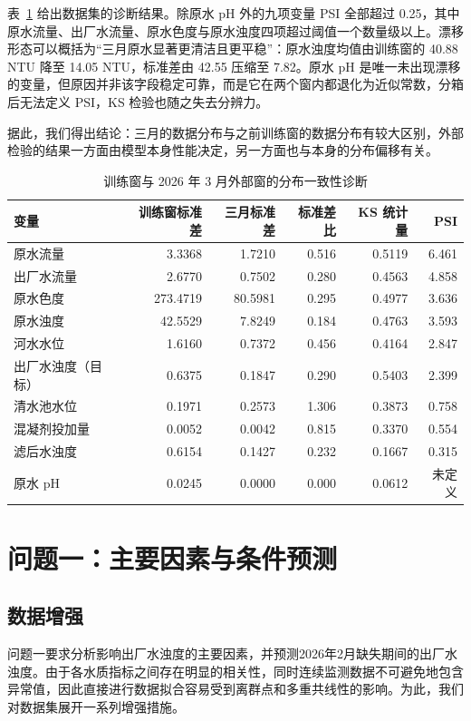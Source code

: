 \documentclass[UTF8,12pt,a4paper]{ctexart}
\begin{document}
表~\ref{tab:shift} 给出数据集的诊断结果。除原水 pH 外的九项变量 PSI 全部超过 0.25，其中原水流量、出厂水流量、原水色度与原水浊度四项超过阈值一个数量级以上。漂移形态可以概括为“三月原水显著更清洁且更平稳”：原水浊度均值由训练窗的 40.88 NTU 降至 14.05 NTU，标准差由 42.55 压缩至 7.82。原水 pH 是唯一未出现漂移的变量，但原因并非该字段稳定可靠，而是它在两个窗内都退化为近似常数，分箱后无法定义 PSI，KS 检验也随之失去分辨力。

据此，我们得出结论：三月的数据分布与之前训练窗的数据分布有较大区别，外部检验的结果一方面由模型本身性能决定，另一方面也与本身的分布偏移有关。

\begin{table}[htbp]
\centering
\caption{训练窗与 2026 年 3 月外部窗的分布一致性诊断}
\label{tab:shift}
\begin{tabular}{lrrrrr}
\toprule
变量 & 训练窗标准差 & 三月标准差 & 标准差比 & KS 统计量 & PSI\\
\midrule
原水流量 & 3.3368 & 1.7210 & 0.516 & 0.5119 & 6.461\\
出厂水流量 & 2.6770 & 0.7502 & 0.280 & 0.4563 & 4.858\\
原水色度 & 273.4719 & 80.5981 & 0.295 & 0.4977 & 3.636\\
原水浊度 & 42.5529 & 7.8249 & 0.184 & 0.4763 & 3.593\\
河水水位 & 1.6160 & 0.7372 & 0.456 & 0.4164 & 2.847\\
出厂水浊度（目标） & 0.6375 & 0.1847 & 0.290 & 0.5403 & 2.399\\
清水池水位 & 0.1971 & 0.2573 & 1.306 & 0.3873 & 0.758\\
混凝剂投加量 & 0.0052 & 0.0042 & 0.815 & 0.3370 & 0.554\\
滤后水浊度 & 0.6154 & 0.1427 & 0.232 & 0.1667 & 0.315\\
原水 pH & 0.0245 & 0.0000 & 0.000 & 0.0612 & 未定义\\
\bottomrule
\end{tabular}
\end{table}
\section{问题一：主要因素与条件预测}

\subsection{数据增强}

问题一要求分析影响出厂水浊度的主要因素，并预测2026年2月缺失期间的出厂水浊度。由于各水质指标之间存在明显的相关性，同时连续监测数据不可避免地包含异常值，因此直接进行数据拟合容易受到离群点和多重共线性的影响。为此，我们对数据集展开一系列增强措施。
\end{document}
